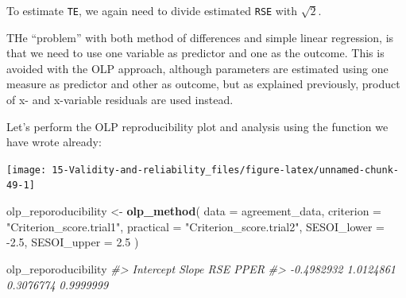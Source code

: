 \documentclass[
]{book}
\newenvironment{Shaded}{\begin{snugshade}}{\end{snugshade}}
\newcommand{\CommentTok}[1]{\textcolor[rgb]{0.56,0.35,0.01}{\textit{#1}}}
\newcommand{\DataTypeTok}[1]{\textcolor[rgb]{0.13,0.29,0.53}{#1}}
\newcommand{\FloatTok}[1]{\textcolor[rgb]{0.00,0.00,0.81}{#1}}
\newcommand{\KeywordTok}[1]{\textcolor[rgb]{0.13,0.29,0.53}{\textbf{#1}}}
\newcommand{\NormalTok}[1]{#1}
\newcommand{\OperatorTok}[1]{\textcolor[rgb]{0.81,0.36,0.00}{\textbf{#1}}}
\newcommand{\StringTok}[1]{\textcolor[rgb]{0.31,0.60,0.02}{#1}}
\begin{document}
To estimate \texttt{TE}, we again need to divide estimated \texttt{RSE} with \(\sqrt{2}\).

THe ``problem'' with both method of differences and simple linear regression, is that we need to use one variable as predictor and one as the outcome. This is avoided with the OLP approach, although parameters are estimated using one measure as predictor and other as outcome, but as explained previously, product of x- and x-variable residuals are used instead.

Let's perform the OLP reproducibility plot and analysis using the function we have wrote already:

\begin{Shaded}
\end{Shaded}

\begin{center}\texttt{[image: 15-Validity-and-reliability\_files/figure-latex/unnamed-chunk-49-1]} \end{center}

\begin{Shaded}
\begin{Highlighting}[]
\NormalTok{olp\_reporoducibility <{-}}\StringTok{ }\KeywordTok{olp\_method}\NormalTok{(}
  \DataTypeTok{data =}\NormalTok{ agreement\_data,}
  \DataTypeTok{criterion =} \StringTok{"Criterion\_score.trial1"}\NormalTok{,}
  \DataTypeTok{practical =} \StringTok{"Criterion\_score.trial2"}\NormalTok{,}
  \DataTypeTok{SESOI\_lower =} \FloatTok{{-}2.5}\NormalTok{,}
  \DataTypeTok{SESOI\_upper =} \FloatTok{2.5}
\NormalTok{)}

\NormalTok{olp\_reporoducibility}
\CommentTok{\#>  Intercept      Slope        RSE       PPER }
\CommentTok{\#> {-}0.4982932  1.0124861  0.3076774  0.9999999}
\end{Highlighting}
\end{Shaded}
\end{document}
